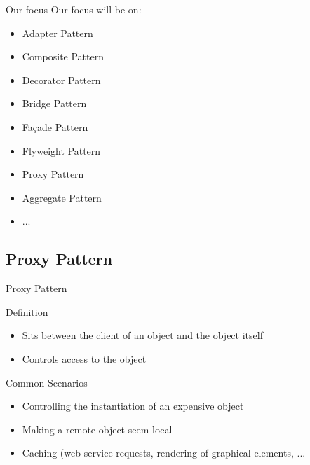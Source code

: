 \documentclass{beamer}
\newcommand{\light}[1]{\textcolor{light-gray}{#1}}
\begin{document}
\begin{frame}{Our focus}
Our focus will be on:
  \begin{itemize}

  \item {
    \light{Adapter Pattern}
  }
  \item {   
    \light{Composite Pattern}
  }
  \item {
    Decorator Pattern
  }
  \item {
    \light{Bridge Pattern}
  }
  \item {
    Fa\c{c}ade Pattern
  }
  \item {
    \light{Flyweight Pattern}
  }
   \item {
    Proxy Pattern
  }
  \item {
    \light{Aggregate Pattern}
  }
   \item {
    ...
  }
  \end{itemize}
\end{frame}


\subsection{Proxy Pattern}
\begin{frame}{Proxy Pattern}
  \begin{block}{Definition}
   \begin{itemize}
    \item { Sits between the client of an object and the object itself }
    \item { Controls access to the object }
   \end{itemize}
  \end{block}
  \pause
  \begin{block}{Common Scenarios}
   \begin{itemize}
    \item { Controlling the instantiation of an expensive object }
    \item { Making a remote object seem local }
    \item { Caching (web service requests, rendering of graphical elements, ... }
   \end{itemize}
  \end{block}
\end{frame}
\end{document}
